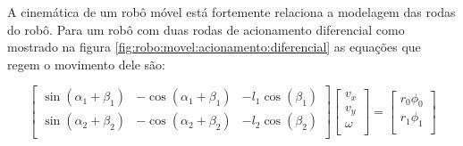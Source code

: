 A cinemática de um robô móvel está fortemente relaciona a modelagem
das rodas do robô. Para um robô com duas rodas de acionamento diferencial
como mostrado na figura \ref{fig:robo:movel:acionamento:diferencial}
as equações que regem o movimento dele são:

\[
\begin{bmatrix}
    \sin(\alpha_{1} + \beta_{1}) &  -\cos(\alpha_{1} + \beta_{1}) &  -l_1\cos(\beta_{1})\\
    \sin(\alpha_{2} + \beta_{2}) &  -\cos(\alpha_{2} + \beta_{2}) &  -l_2\cos(\beta_{2})\\
\end{bmatrix}
\begin{bmatrix}
    v_x \\
    v_y \\
    \omega\\
\end{bmatrix}
=
\begin{bmatrix}
    r_0\phi_0 \\
    r_1\phi_1 \\
\end{bmatrix}
\]



